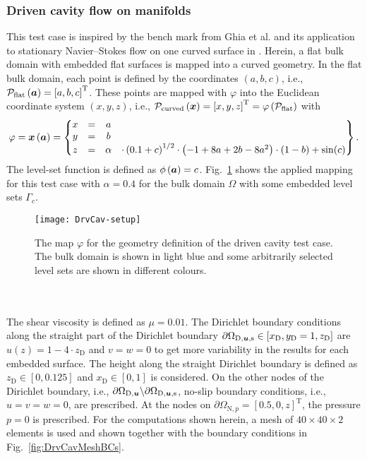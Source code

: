 \documentclass[12pt, twoside, english]{article}
\numberwithin{equation}{section}
\newcommand{\vek}[1]{\mathchoice{\displaystyle\boldsymbol#1}
{\textstyle\boldsymbol#1}{\scriptstyle\boldsymbol#1}
{\scriptscriptstyle\boldsymbol#1}}
\begin{document}
\subsubsection{Driven cavity flow on manifolds}
This test case is inspired by the bench mark from Ghia et al. \cite{Ghia_1982a} and its application to stationary Navier--Stokes flow on one curved surface in \cite{Fries_2018a}. Herein, a flat bulk domain with embedded flat surfaces is mapped into a curved geometry. In the flat bulk domain, each point is defined by the coordinates $\left(a,b,c\right)$, i.e., $\mathcal{P}_{\mathrm{flat}} \left(\vek{a}\right) = \left[a,b,c\right]^{\mathrm{T}}$. These points are mapped with $\varphi$ into the Euclidean coordinate system $\left(x,y,z\right)$, i.e., $\mathcal{P}_{\mathrm{curved}} \left(\vek{x}\right)  = \left[x,y,z\right]^{\mathrm{T}} = \varphi\left(\mathcal{P}_{\mathrm{flat}}\right)$ with
\begin{equation*}
	\varphi = \vek{x}\left(\vek{a}\right) = \begin{Bmatrix} 
		x &=& a & \\ 
		y &=& b &\\ 
		z &=& \alpha & \cdot \left(0.1+c\right)^{1/2} \cdot \left(-1+8a + 2b - 8a^2\right) \cdot \left(1-b\right) + \sin(c) 
	\end{Bmatrix}.
\end{equation*}
The level-set function is defined as $\phi\left(\vek{a}\right)=c$. Fig.~\ref{fig:DrvCavMap} shows the applied mapping for this test case with $\alpha = 0.4$ for the bulk domain $\Omega$ with some embedded level sets $\Gamma_{\!c}$.
\begin{figure}
	\centering
	
	\texttt{[image: DrvCav-setup]}
	
	\caption{\label{fig:DrvCavMap} The map $\varphi$ for the geometry definition of the driven cavity test case. The bulk domain is shown in light blue and some arbitrarily selected level sets are shown in different colours.}
\end{figure}\\
\\
The shear viscosity is defined as $\mu = 0.01$. The Dirichlet boundary conditions along the straight part of the Dirichlet boundary $\partial \Omega_{\mathrm{D},\vek{u},\mathrm{s}} \in \left[x_{\mathrm{D}},y_{\mathrm{D}}=1,z_{\mathrm{D}}\right]$ are $u(z) = 1-4\cdot z_{\mathrm{D}}$ and $v=w=0$ to get more variability in the results for each embedded surface. The height along the straight Dirichlet boundary is defined as $z_{\mathrm{D}} \in [0,0.125]$ and $x_{\mathrm{D}} \in [0,1]$ is considered. On the other nodes of the Dirichlet boundary, i.e., $\partial \Omega_{\mathrm{D},\vek{u}} \backslash \partial \Omega_{\mathrm{D},\vek{u},\mathrm{s}}$, no-slip boundary conditions, i.e., $u=v=w=0$, are prescribed. At the nodes on $\partial \Omega_{\mathrm{N},p} = \left[0.5,0,z\right]^{\mathrm{T}}$, the pressure $p=0$ is prescribed. For the computations shown herein, a mesh of $40 \times 40 \times 2$ elements is used and shown together with the boundary conditions in Fig.~\ref{fig:DrvCavMeshBCs}.
\end{document}
